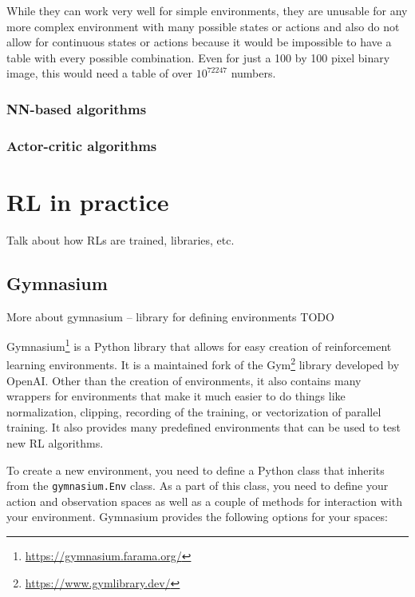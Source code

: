 \documentclass[
  digital,     %
  oneside,     %
  nosansbold,  %
  nocolorbold, %
  lof,         %
  lot,         %
]{fithesis4}
\begin{document}
While they can work very well for simple environments, they are unusable for any more complex environment with many possible states or actions and also do not allow for continuous states or actions because it would be impossible to have a table with every possible combination. Even for just a 100 by 100 pixel binary image, this would need a table of over $10^{72247}$ numbers.

\subsection{NN-based algorithms}

\subsection{Actor-critic algorithms}

\chapter{RL in practice}
Talk about how RLs are trained, libraries, etc.

\section{Gymnasium}
\label{section:gym}
More about gymnasium -- library for defining environments TODO

Gymnasium\footnote{\url{https://gymnasium.farama.org/}} is a Python library that allows for easy creation of reinforcement learning environments. It is a maintained fork of the Gym\footnote{\url{https://www.gymlibrary.dev/}} library developed by OpenAI. Other than the creation of environments, it also contains many wrappers for environments that make it much easier to do things like normalization, clipping, recording of the training, or vectorization of parallel training. It also provides many predefined environments that can be used to test new RL algorithms.

To create a new environment, you need to define a Python class that inherits from the \texttt{gymnasium.Env} class. As a part of this class, you need to define your action and observation spaces as well as a couple of methods for interaction with your environment. Gymnasium provides the following options for your spaces:
\end{document}
